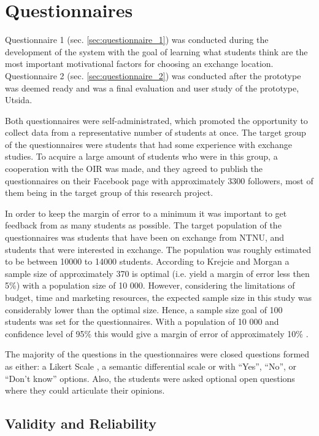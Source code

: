 \section{Questionnaires}

Questionnaire 1 (sec. \ref{sec:questionnaire_1}) was conducted during the development of the system with the goal of learning what students think are the most important motivational factors for choosing an exchange location. Questionnaire 2 (sec. \ref{sec:questionnaire_2}) was conducted after the prototype was deemed ready and was a final evaluation and user study of the prototype, Utsida.

Both questionnaires were self-administrated, which promoted the opportunity to collect data from a representative number of students at once. The target group of the questionnaires were students that had some experience with exchange studies. To acquire a large amount of students who were in this group, a cooperation with the OIR was made, and they agreed to publish the questionnaires on their Facebook page with approximately 3300 followers, most of them being in the target group of this research project.

In order to keep the margin of error to a minimum it was important to get feedback from as many students as possible. The target population of the questionnaires was students that have been on exchange from NTNU, and students that were interested in exchange. The population was roughly estimated to be between 10000 to 14000 students. According to Krejcie and Morgan \cite{krejcie1970determining} a sample size of approximately 370 is optimal (i.e. yield a margin of error less then 5\%) with a population size of 10 000. However, considering the limitations of budget, time and marketing resources, the expected sample size in this study was considerably lower than the optimal size. Hence, a sample size goal of 100 students was set for the questionnaires. With a population of 10 000 and confidence level of 95\% this would give a margin of error of approximately 10\% \cite{yamane1973statistics}. 

The majority of the questions in the questionnaires were closed questions formed as either: a Likert Scale \cite{allen2007likert}, a semantic differential scale \cite{osgood1952nature} or with \enquote{Yes}, \enquote{No}, or \enquote{Don't know} options. Also, the students were asked optional open questions where they could articulate their opinions. 

\subsection{Validity and Reliability}

